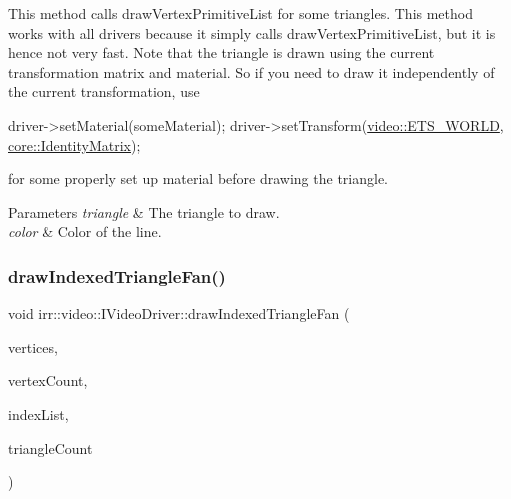 This method calls draw\+Vertex\+Primitive\+List for some triangles. This method works with all drivers because it simply calls draw\+Vertex\+Primitive\+List, but it is hence not very fast. Note that the triangle is drawn using the current transformation matrix and material. So if you need to draw it independently of the current transformation, use 
\begin{DoxyCode}
driver->setMaterial(someMaterial);
driver->setTransform(\hyperlink{namespaceirr_1_1video_a15b57657a320243be03ae6f66fcff43da843cf42adb3fa9caf61c9e228cf14e85}{video::ETS\_WORLD}, \hyperlink{namespaceirr_1_1core_ac4561f3920d3fbfbfff74c9bed1f2713}{core::IdentityMatrix});
\end{DoxyCode}
 for some properly set up material before drawing the triangle. 
\begin{DoxyParams}{Parameters}
{\em triangle} & The triangle to draw. \\
\hline
{\em color} & Color of the line. \\
\hline
\end{DoxyParams}
\mbox{\label{classirr_1_1video_1_1IVideoDriver_a8303b9a0f3e941d07d8cdc70c8fc1346}} 
\subsubsection{\texorpdfstring{draw\+Indexed\+Triangle\+Fan()}{drawIndexedTriangleFan()}\hspace{0.1cm}{\footnotesize\ttfamily [1/3]}}
{\footnotesize\ttfamily void irr\+::video\+::\+I\+Video\+Driver\+::draw\+Indexed\+Triangle\+Fan (\begin{DoxyParamCaption}\item[{const \hyperlink{structirr_1_1video_1_1S3DVertex}{S3\+D\+Vertex} $\ast$}]{vertices,  }\item[{\hyperlink{namespaceirr_a0416a53257075833e7002efd0a18e804}{u32}}]{vertex\+Count,  }\item[{const \hyperlink{namespaceirr_ae9f8ec82692ad3b83c21f555bfa70bcc}{u16} $\ast$}]{index\+List,  }\item[{\hyperlink{namespaceirr_a0416a53257075833e7002efd0a18e804}{u32}}]{triangle\+Count }\end{DoxyParamCaption})\hspace{0.3cm}{\ttfamily [inline]}}



